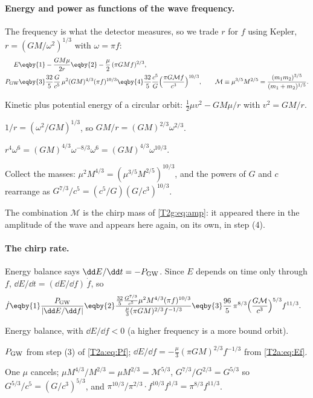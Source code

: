 \paragraph{Energy and power as functions of the wave frequency.}
The frequency is what the detector measures, so we trade $r$ for $f$ using Kepler, $r=(GM/\omega^2)^{1/3}$ with $\omega=\pi f$:
\begin{align}
  E&\eqby{1}-\frac{GM\mu}{2r}\eqby{2}-\frac{\mu}{2}\,(\pi GMf)^{2/3},\label{T2a:eq:Ef}\\
  P_{\rm GW}&\eqby{3}\frac{32}{5}\frac{G}{c^5}\,\mu^2(GM)^{4/3}(\pi f)^{10/3}
  \eqby{4}\frac{32}{5}\frac{c^5}{G}\Big(\frac{\pi G\mathcal M f}{c^3}\Big)^{10/3},
  \qquad \mathcal M\equiv\mu^{3/5}M^{2/5}=\frac{(m_1m_2)^{3/5}}{(m_1+m_2)^{1/5}} .\label{T2a:eq:Pf}
\end{align}
\begin{explain}
  \item Kinetic plus potential energy of a circular orbit: $\tfrac12\mu v^2-GM\mu/r$ with $v^2=GM/r$.
  \item $1/r=(\omega^2/GM)^{1/3}$, so $GM/r=(GM)^{2/3}\omega^{2/3}$.
  \item $r^4\omega^6=(GM)^{4/3}\omega^{-8/3}\omega^6=(GM)^{4/3}\omega^{10/3}$.
  \item Collect the masses: $\mu^2M^{4/3}=(\mu^{3/5}M^{2/5})^{10/3}$, and the powers of $G$ and $c$ rearrange as $G^{7/3}/c^5=(c^5/G)(G/c^3)^{10/3}$.
\end{explain}
The combination $\mathcal M$ is the chirp mass of \eqref{T2g:eq:amp}: it appeared there in the amplitude of the wave and appears here again, on its own, in step (4).

\paragraph{The chirp rate.}
Energy balance says $\dd E/\dd t=-P_{\rm GW}$. Since $E$ depends on time only through $f$, $\dd E/\dd t=(\dd E/\dd f)\,\dot f$, so
\begin{align}
  \dot f&\eqby{1}\frac{P_{\rm GW}}{\lvert\dd E/\dd f\rvert}
  \eqby{2}\frac{\tfrac{32}{5}\tfrac{G^{7/3}}{c^5}\mu^2M^{4/3}(\pi f)^{10/3}}{\tfrac{\mu}{3}(\pi GM)^{2/3}f^{-1/3}}
  \eqby{3}\frac{96}{5}\,\pi^{8/3}\Big(\frac{G\mathcal M}{c^3}\Big)^{5/3}f^{11/3}.\label{T2a:eq:fdot}
\end{align}
\begin{explain}
  \item Energy balance, with $\dd E/\dd f<0$ (a higher frequency is a more bound orbit).
  \item $P_{\rm GW}$ from step (3) of \eqref{T2a:eq:Pf}; $\dd E/\dd f=-\tfrac{\mu}{3}(\pi GM)^{2/3}f^{-1/3}$ from \eqref{T2a:eq:Ef}.
  \item One $\mu$ cancels; $\mu M^{4/3}/M^{2/3}=\mu M^{2/3}=\mathcal M^{5/3}$, $G^{7/3}/G^{2/3}=G^{5/3}$ so $G^{5/3}/c^5=(G/c^3)^{5/3}$, and $\pi^{10/3}/\pi^{2/3}\cdot f^{10/3}f^{1/3}=\pi^{8/3}f^{11/3}$.
\end{explain}

